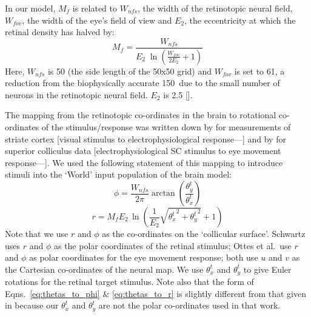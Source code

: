 \documentclass{frontiersSCNS}
\begin{document}
In our model, $M_f$ is related to $W_{nfs}$, the width of the retinotopic neural
field, $W_{fov}$, the width of the eye's field of view and $E_2$, the
eccentricity at which the retinal density has halved by:
\begin{equation} \label{eq:fm}
   M_f = \frac {W_{nfs}} {E_2\;\ln\left(\frac{W_{fov}}{2 E_2} + 1\right)}
\end{equation}
Here, $W_{nfs}$ is 50 (the side length of the 50x50 grid)
and $W_{fov}$ is set to 61\dg, a
reduction from the biophysically accurate 150\dg~due to the small
number of neurons in the retinotopic neural field. $E_2$ is
2.5 [\cite{cope_basal_2017,slotnick_electrophysiological_2001}].

The mapping from the retinotopic co-ordinates in the brain to rotational
co-ordinates of the stimulus/response was written down by
\cite{schwartz_spatial_1977,eric_l._schwartz_computational_1980}
for measurements of
striate cortex [visual stimulus to electrophysiological response---\cite{daniel_representation_1961, talbot_physiological_1941}]
and by \cite{ottes_visuomotor_1986} for superior colliculus data
[electrophysiological SC stimulus to eye movement
response---\cite{robinson_eye_1972}].
We used the following statement of this mapping to introduce stimuli
into the `World' input population of the brain model:
\begin{equation}\label{eq:thetas_to_phi}
   \phi = \frac{W_{nfs}} {2 \pi}\arctan\left(\frac{\theta_{y}^{t}}{\theta_{x}^{t}}\right)
\end{equation}
\begin{equation}\label{eq:thetas_to_r}
   r = M_fE_2\,\ln\left(\frac{1}{E_2}\sqrt{{\theta_{x}^{t}}^2 + {\theta_{y}^{t}}^2}+1\right)
\end{equation}
Note that we use $r$ and $\phi$ as the co-ordinates on the `collicular
surface'. Schwartz uses $r$ and $\phi$ as the polar coordinates of the
retinal stimulus; Ottes et al.~use $r$ and $\phi$ as polar coordinates
for the eye movement response; both use $u$ and $v$ as the Cartesian co-ordinates of the neural map. We use $\theta_{x}^{t}$ and $\theta_{y}^{t}$
to give Euler rotations for the retinal target stimulus. Note also that
the form of Eqns.~\ref{eq:thetas_to_phi} \& \ref{eq:thetas_to_r} is slightly
different from that given in
\cite{ottes_visuomotor_1986} because our $\theta_{x}^{t}$ and
$\theta_{y}^{t}$ are not the polar co-ordinates used in that work.
\end{document}
